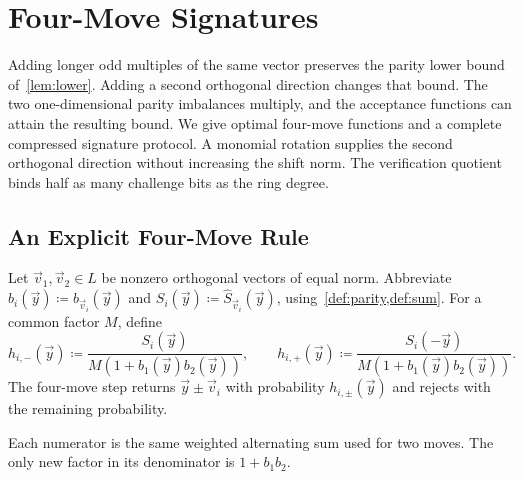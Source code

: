 \section{Four-Move Signatures}
\label{sec:multimodal}

Adding longer odd multiples of the same vector preserves the parity lower bound of~\cref{lem:lower}. Adding a second orthogonal direction changes that bound. The two one-dimensional parity imbalances multiply, and the acceptance functions can attain the resulting bound. We give optimal four-move functions and a complete compressed signature protocol. A monomial rotation supplies the second orthogonal direction without increasing the shift norm. The verification quotient binds half as many challenge bits as the ring degree.

\subsection{An Explicit Four-Move Rule}

\begin{definition}
\label{def:four-moves}
Let $\vec v_1,\vec v_2\in L$ be nonzero orthogonal vectors of equal norm. Abbreviate $b_i(\vec y)\coloneqq b_{\vec v_i}(\vec y)$ and $S_i(\vec y)\coloneqq\widehat S_{\vec v_i}(\vec y)$, using~\cref{def:parity,def:sum}. For a common factor $M$, define
\begin{equation}
\label{eq:four-probabilities}
 \boxed{\displaystyle
 h_{i,-}(\vec y)\coloneqq\frac{S_i(\vec y)}{M(1+b_1(\vec y)b_2(\vec y))},\qquad
 h_{i,+}(\vec y)\coloneqq\frac{S_i(-\vec y)}{M(1+b_1(\vec y)b_2(\vec y))}.}
\end{equation}
The four-move step returns $\vec y\pm\vec v_i$ with probability $h_{i,\pm}(\vec y)$ and rejects with the remaining probability.
\end{definition}

Each numerator is the same weighted alternating sum used for two moves. The only new factor in its denominator is $1+b_1b_2$.

